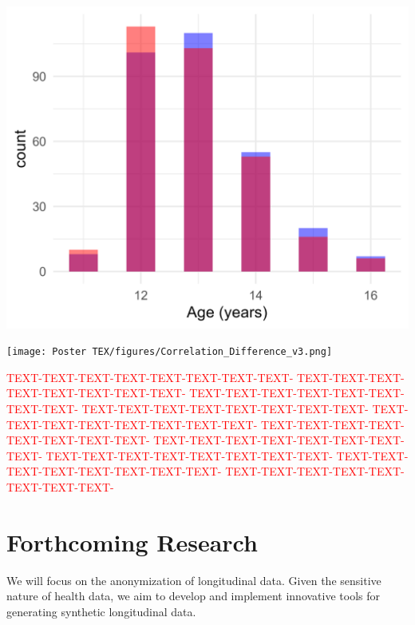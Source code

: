 \documentclass[a0,portrait]{a0poster}
\begin{document}
\begin{multicols}{3}
\vspace{1cm}
\includegraphics[width=1\linewidth]{Poster TEX/figures/Histogram_ageyr_v2.png}


\columnbreak %

\vspace{1cm}
\texttt{[image: Poster TEX/figures/Correlation\_Difference\_v3.png]}

\textcolor{red}{
TEXT-TEXT-TEXT-TEXT-TEXT-TEXT-TEXT-TEXT-
TEXT-TEXT-TEXT-TEXT-TEXT-TEXT-TEXT-TEXT-
TEXT-TEXT-TEXT-TEXT-TEXT-TEXT-TEXT-TEXT-
TEXT-TEXT-TEXT-TEXT-TEXT-TEXT-TEXT-TEXT-
TEXT-TEXT-TEXT-TEXT-TEXT-TEXT-TEXT-TEXT-
TEXT-TEXT-TEXT-TEXT-TEXT-TEXT-TEXT-TEXT-
TEXT-TEXT-TEXT-TEXT-TEXT-TEXT-TEXT-TEXT-
TEXT-TEXT-TEXT-TEXT-TEXT-TEXT-TEXT-TEXT-
TEXT-TEXT-TEXT-TEXT-TEXT-TEXT-TEXT-TEXT-
TEXT-TEXT-TEXT-TEXT-TEXT-TEXT-TEXT-TEXT-
} 

\section{Forthcoming Research}

We will focus on the anonymization of longitudinal data.
Given the sensitive nature of health data, we aim to develop and implement innovative tools for generating synthetic longitudinal data.


\end{multicols}
\end{document}
